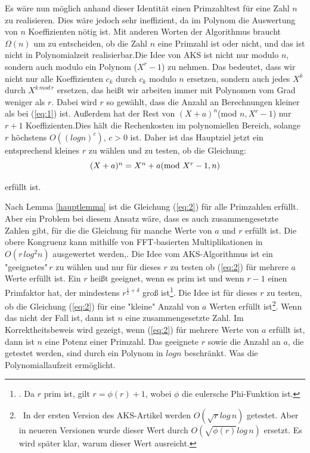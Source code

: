 \documentclass[12pt,oneside]{article}
\theoremstyle{remark}
\theoremstyle{definition}
\begin{document}
\begin{flushleft}
Es wäre nun möglich anhand dieser Identität einen Primzahltest für eine Zahl $n$ zu realisieren. Dies wäre jedoch sehr ineffizient, da im Polynom die Auswertung von $n$ Koeffizienten nötig ist. Mit anderen Worten der Algorithmus braucht $\Omega(n)$ um zu entscheiden, ob die Zahl $n$ eine Primzahl ist oder nicht, und das ist nicht in Polynomialzeit realisierbar.\newline\newline Die Idee von AKS ist nicht nur modulo $n$, sondern auch modulo ein Polynom ($X^r -1$) zu nehmen. Das bedeutet, dass wir nicht nur alle Koeffizienten $c_{k}$ durch $c_{k}$ modulo $n$ ersetzen, sondern auch jedes $X^k$ durch $X^{k \, mod \, r}$ ersetzen, das heißt wir arbeiten immer mit Polynomen vom Grad weniger als $r$. Dabei wird $r$ so gewählt, dass die Anzahl an Berechnungen kleiner als bei (\ref{eq:1}) ist. Außerdem hat der Rest von $(X + a)^n$(mod $ n, X^r - 1$) nur $ r + 1$ Koeffizienten.\newline Dies hält die Rechenkosten im polynomiellen Bereich, solange $r$ höchstens $O ((log n)^c), \, c > 0$ ist.
Daher ist das Hauptziel jetzt ein entsprechend kleines $r$ zu wählen und zu testen, ob die Gleichung:\newline\newline
\begin{equation}\label{eq:2}
    \centerline{$(X + a)^n = X^n + a $(mod $X^r - 1, n$)}
\end{equation}

erfüllt ist.\newline

Nach Lemma \ref{hauptlemma} ist die Gleichung (\ref{eq:2}) für alle Primzahlen erfüllt. Aber ein Problem bei diesem Ansatz wäre, dass es auch zusammengesetzte Zahlen gibt, für die die Gleichung für manche Werte von $a$ und $r$ erfüllt ist. Die obere Kongruenz kann mithilfe von FFT-basierten Multiplikationen in $O(r \, log^2 n)$ ausgewertet werden\cite{D73},\cite{computer-algebra}. Die Idee vom AKS-Algorithmus ist ein "geeignetes"$\, r$ zu wählen und nur für dieses $r$ zu testen ob (\ref{eq:2}) für mehrere $a$ Werte erfüllt ist. Ein $r$ heißt geeignet, wenn es prim ist und wenn $r - 1$ einen Primfaktor hat, der mindestens $r^{\frac{1}{2} + \delta}$ groß ist\footnote{. Da $r$ prim ist, gilt $r = \phi(r) + 1 $, wobei $\phi$ die eulersche Phi-Funktion ist.}. Die Idee ist für dieses $r$ zu testen, ob die Gleichung (\ref{eq:2}) für eine "kleine"$ $ Anzahl von $a$ Werten erfüllt ist\footnote{$\,$ In der ersten Version des AKS-Artikel werden $O(\sqrt{r}log \, n)$ getestet. Aber in neueren Versionen wurde dieser Wert durch $O(\sqrt{\phi(r)}log \, n)$ ersetzt. Es wird später klar, warum dieser Wert ausreicht.}. Wenn das nicht der Fall ist, dann ist $n$ eine zusammengesetzte Zahl. Im Korrektheitsbeweis wird gezeigt, wenn (\ref{eq:2}) für mehrere Werte von $a$ erfüllt ist, dann ist $n$ eine Potenz einer Primzahl. Das geeignete $r$ sowie die Anzahl an $a$, die getestet werden, sind durch ein Polynom in $log n$ beschränkt. Was die Polynomiallaufzeit ermöglicht.

\newpage

\end{flushleft}
\end{document}
